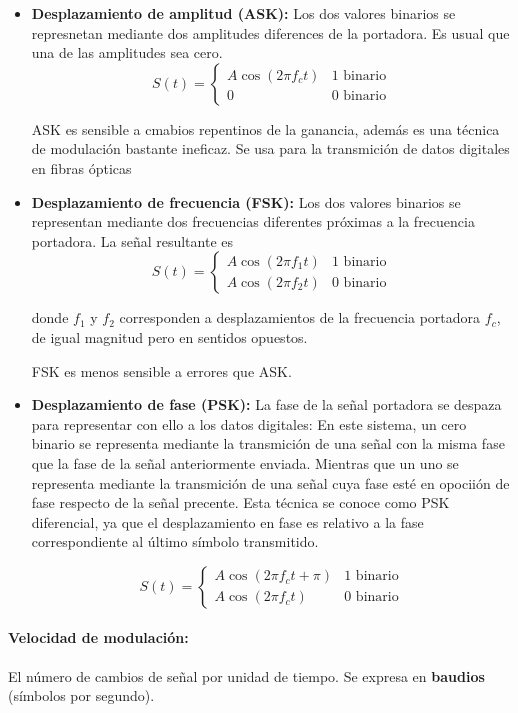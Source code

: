 \begin{itemize}
  \item \textbf{Desplazamiento de amplitud (ASK):} Los dos valores binarios se represnetan mediante dos amplitudes diferences de la portadora. Es usual que una de las amplitudes sea cero.
  \[
    S(t) = \begin{cases}
      A\cos(2\pi f_c t) & \text{1 binario} \\
      0 & \text{0 binario}
    \end{cases}
  \]

  ASK es sensible a cmabios repentinos de la ganancia, además es una técnica de modulación bastante ineficaz. Se usa para la transmición de datos digitales en fibras ópticas
  \item  \textbf{Desplazamiento de frecuencia (FSK):} Los dos valores binarios se representan mediante dos frecuencias diferentes próximas a la frecuencia portadora. La señal resultante es
  \[
    S(t) = \begin{cases}
      A\cos(2\pi f_1 t) & \text{1 binario} \\
      A\cos(2\pi f_2 t) & \text{0 binario}
    \end{cases}
  \]
  
  donde \(f_1\) y \(f_2\) corresponden a desplazamientos de la frecuencia portadora \(f_c\), de igual magnitud pero en sentidos opuestos.

  FSK es menos sensible a errores que ASK.
  \item  \textbf{Desplazamiento de fase (PSK):} La fase de la señal portadora se despaza para representar con ello a los datos digitales: En este sistema, un cero binario se representa mediante la transmición de una señal con la misma fase que la fase de la señal anteriormente enviada. Mientras que un uno se representa mediante la transmición de una señal cuya fase esté en opociión de fase respecto de la señal precente. Esta técnica se conoce como PSK diferencial, ya que el desplazamiento en fase es relativo a la fase correspondiente al último símbolo transmitido.
  
  \[
    S(t) = \begin{cases}
      A\cos(2\pi f_c t + \pi) & \text{1 binario} \\
      A\cos(2\pi f_c t) & \text{0 binario}
    \end{cases}
  \]
\end{itemize}

\paragraph{Velocidad de modulación:} El número de cambios de señal por unidad de tiempo. Se expresa en \textbf{baudios} (símbolos por segundo).

